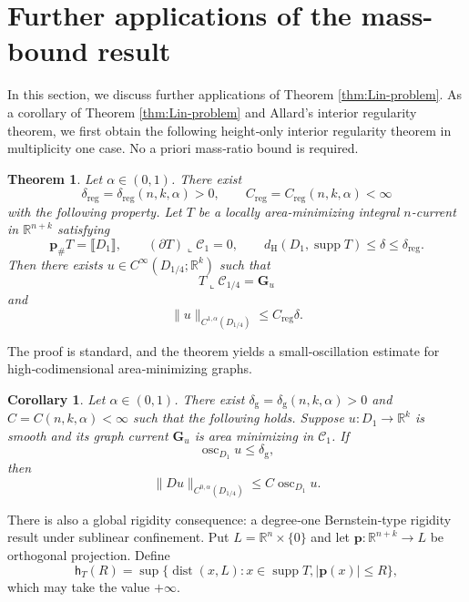\documentclass[11pt,reqno]{amsart}
\numberwithin{equation}{section}
\newtheorem{theorem}{Theorem}[section]
\newtheorem{corollary}[corollary]{Corollary}
\theoremstyle{definition}
\theoremstyle{remark}
\begin{document}
\section{Further applications of the mass-bound result}\label{sec:app}


In this section, we discuss further  applications of Theorem \ref{thm:Lin-problem}. 
As a corollary of Theorem \ref{thm:Lin-problem} and Allard’s interior regularity theorem, we first obtain the following height‑only interior regularity theorem in multiplicity one case. No a priori mass‑ratio bound is required.
\begin{theorem}
\label{thm:height-only}
Let $\alpha\in(0,1)$. There exist
\[
  \delta_{\mathrm{reg}}
  =\delta_{\mathrm{reg}}(n,k,\alpha)>0,
  \qquad
  C_{\mathrm{reg}}
  =C_{\mathrm{reg}}(n,k,\alpha)<\infty
\]
with the following property. Let $T$ be a locally area-minimizing integral
$n$-current in $\mathbb R^{n+k}$ satisfying
\[
  \mathbf p_\#T=\llbracket D_1\rrbracket,
  \qquad
  (\partial T)\llcorner\mathcal C_1=0,
  \qquad
  d_{\mathrm H}(D_1,\operatorname{supp}T)\leq\delta
  \leq\delta_{\mathrm{reg}}.
\]
Then there exists $u\in C^\infty(D_{1/4};\mathbb R^k)$ such that
\[
  T\llcorner\mathcal C_{1/4}=\mathbf G_u
\]
and
\[
  \|u\|_{C^{1,\alpha}(D_{1/4})}
  \leq C_{\mathrm{reg}}\delta.
\]
\end{theorem}
The proof is standard, and the theorem yields a small‑oscillation estimate for high‑codimensional area‑minimizing graphs.
\begin{corollary}
\label{cor:small-oscillation}
Let $\alpha\in(0,1)$. There exist
$\delta_{\mathrm g}=\delta_{\mathrm g}(n,k,\alpha)>0$
and $C=C(n,k,\alpha)<\infty$ such that the following holds.
Suppose $u:D_1\to\mathbb R^k$ is smooth and its graph current
$\mathbf G_u$ is area minimizing in $\mathcal C_1$. If
\[
  \operatorname{osc}_{D_1}u\leq\delta_{\mathrm g},
\]
then
\[
  \|Du\|_{C^{0,\alpha}(D_{1/4})}
  \leq C\operatorname{osc}_{D_1}u.
\]
\end{corollary}

There is also a global rigidity consequence: a degree‑one Bernstein‑type rigidity result under sublinear confinement.  
 Put
$L=\mathbb R^n\times\{0\}$ and let
$\mathbf p:\mathbb R^{n+k}\to L$ be orthogonal projection.  Define
\begin{equation}
  \mathsf h_T(R)
  =\sup\bigl\{\operatorname{dist}(x,L):
        x\in\operatorname{supp}T,
        |\mathbf p(x)|\leq R\bigr\},
  \label{eq:global-height-function}
\end{equation}
which may take the value $+\infty.$
\end{document}
